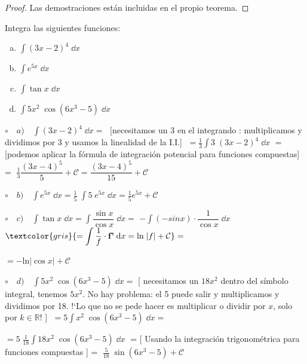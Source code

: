\begin{proof}
	Las demostraciones están incluidas en el propio teorema.
\end{proof}

\begin{ejem} Integra las siguientes funciones:
\begin{multicols}{2}
\begin{enumerate}[a) ]
	\item $\displaystyle  \int (3x-2)^4\; \dd x$
	\item $\displaystyle  \int e^{5x} \; \dd x$
	\item $\displaystyle  \int \tan x \; \dd x$
	\item $\displaystyle  \int 5x^2  \; \cos (6x^3-5)\; \dd x$
\end{enumerate}
\end{multicols}

$\circ \quad a) \quad \displaystyle \int (3x-2)^4\; \dd x =\;$ \small{[necesitamos un 3 en el integrando : multiplicamos y dividimos por 3 y usamos la linealidad de la I.I.] }$\; = {\frac 1 3} \displaystyle \int 3 \; (3x-2)^4\; \dd x \; $ =[podemos aplicar la fórmula de integración potencial para funciones compuestas] = $\; \frac 1 3 \dfrac {(3x-4)^5}{5}+\mathcal C=  \dfrac {(3x-4)^5}{15}+ \mathcal C$

$\circ \quad b) \quad \displaystyle  \int e^{5x} \; \dd x= \displaystyle  \frac 1 5 \; \displaystyle \int 5 \; e^{5x} \; \dd x= \frac 1 5 e^{5x} + \mathcal C$

$\circ \quad c) \quad \displaystyle  \int \tan x \; \dd x = \displaystyle  \int \dfrac {\sin x}{\cos x} \; \dd x = $
$\displaystyle - \int (-sin x) \cdot \dfrac {1}{\cos x} \; \dd x $
$\textcolor{gris}{ = \displaystyle  \int \dfrac 1 f \cdot \textbf{f'} \; \dd x = \mathrm{ln} \;  |f| + \mathcal {C}} =$

$=- \mathrm{ln} |\cos x| + \mathcal C$

$\circ \quad d) \quad \displaystyle  \int 5x^2  \; \cos (6x^3-5)\; \dd x= $ 
\small{[ necesitamos un $18x^2$ dentro del símbolo integral, tenemos $5x^2$. No hay problema: el 5 puede salir y multiplicamos y dividimos por 18. !`Lo que no se pede hacer es multiplicar o dividir por $x$, solo por $k\in \mathbb R$! ]} 
$\; = \displaystyle 5 \int x^2  \; \cos (6x^3-5)\; \dd x =$

$= \displaystyle 5\; \frac 1 {18} \int 18 x^2  \; \cos (6x^3-5)\; \dd x \; $ = [ Usando la integración trigonométrica para funciones compuestas ] = $\; \frac 5 {18}\; \sin (6x^3-5)+ \mathcal C$ 

\end{ejem}
	


